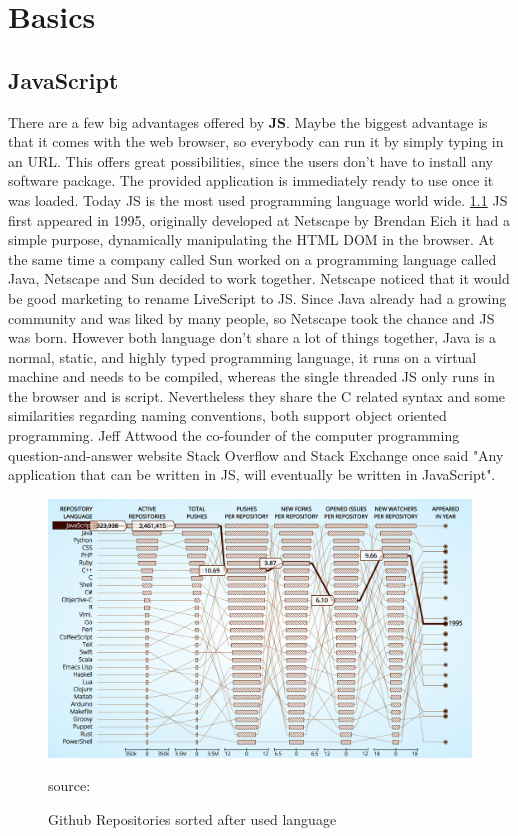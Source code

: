 \chapter{Basics}

\section{JavaScript}
There are a few big advantages offered by \textbf{\gls{JS}}. Maybe the biggest advantage is that it comes with the web browser, so everybody can run it by simply typing in an \gls{URL}. This offers great possibilities, since the users don't have to install any software package. The provided application is immediately ready to use once it was loaded. Today \gls{JS} is the most used programming language world wide. \ref{fig:JS} \gls{JS} first appeared in 1995, originally developed at Netscape by Brendan Eich it had a simple purpose, dynamically manipulating the HTML DOM in the browser. At the same time a company called Sun worked on a programming language called Java, Netscape and Sun decided to work together. Netscape noticed that it would be good marketing to rename LiveScript to \gls{JS}. Since Java already had a growing community and was liked by many people, so Netscape took the chance and \gls{JS} was born. However both language don't share a lot of things together, Java is a normal, static, and highly typed programming language, it runs on a virtual machine and needs to be compiled, whereas the single threaded \gls{JS} only runs in the browser and is script. Nevertheless they share the C related syntax and some similarities regarding naming conventions, both support object oriented programming. Jeff Attwood the co-founder of the  computer programming question-and-answer website Stack Overflow and Stack Exchange once said "Any application that can be written in \gls{JS}, will eventually be written in JavaScript". \cite{HistoryJS1} \cite{HistoryJS2} \cite{HistoryJS3}

\begin{figure}
	\centering
	\includegraphics[scale=0.5]{bilder/grundlagen/jsUsage.png}
	\caption{Github Repositories sorted after used language} source:\cite{JS}
	\label{fig:JS}
\end{figure}



